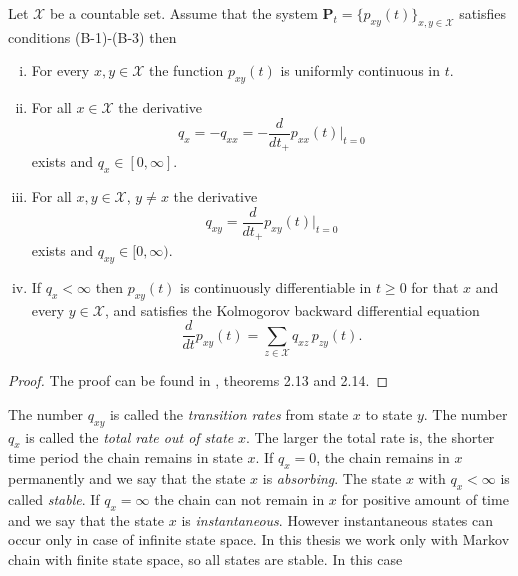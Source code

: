 \begin{thm}
\label{Liget}
Let $\mathcal{X}$ be a countable set. Assume that the system $\bm{P}_t=\{p_{xy}(t)\}_{x,y\in\mathcal{X}}$ satisfies conditions (B-1)-(B-3) then
\begin{enumerate}[(i)]
\item For every $x,y\in\mathcal{X}$ the function $p_{xy}(t)$ is uniformly continuous in $t$. 
\item For all $x\in\mathcal{X}$ the derivative
\[q_x=-q_{xx}=-\frac{d}{dt_+}p_{xx}(t)\Big|_{t=0}\]
exists and $q_x\in[0,\infty].$ 
\item For all $x,y\in\mathcal{X}$, $y\neq x$ the derivative %
\[q_{xy}=\frac{d}{dt_+}p_{xy}(t)\Big|_{t=0}\]
exists and $q_{xy}\in[0,\infty)$.
\item If $q_x<\infty$ then $p_{xy}(t)$ is continuously differentiable in $t\geq 0$ for that $x$ and every $y\in\mathcal{X}$, and satisfies the Kolmogorov backward differential equation
\[\frac{d}{dt}p_{xy}(t)=\sum_{z\in\mathcal{X}} q_{xz} \, p_{zy}(t).\]
\end{enumerate}
\end{thm}
\begin{proof}
The proof can be found in \cite{Liggett}, theorems 2.13 and 2.14.
\end{proof}
The number $q_{xy}$ is called the {\em transition rates} from state $x$ to state $y$. The number $q_{x}$ is called the {\em total rate out of state} $x$. The larger the total rate is, the shorter time period the chain remains in state $x$. If $q_x=0$, the chain remains in $x$ permanently and we say that the state $x$ is {\em absorbing}. The state $x$ with $q_x<\infty$ is called {\em stable}. If $q_x=\infty$ the chain can not remain in $x$ for positive amount of time and we say that the state $x$ is {\em instantaneous}. However instantaneous states can occur only in case of infinite state space. In this thesis we work only with Markov chain with finite state space, so all states are stable. In this case
